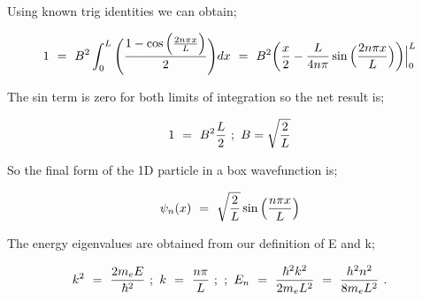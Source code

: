 \documentclass{article}
\begin{document}
Using known trig identities we can obtain;

\begin{equation} \label{eb-eq-237-1}
1 \hspace{0.125cm} = \hspace{0.125cm} B^2 \int_{0}^{L} \Bigg( \frac{1 - \cos\Big({\frac{2n\pi x}{L}\Big)}}{2} \Bigg) dx \hspace{0.125cm} = \hspace{0.125cm} B^2 \bigg( \frac{x}{2} - \frac{L}{4n\pi}\sin\Big({\frac{2n\pi x}{L}\Big)} \bigg) \Big|_0^L 
\end{equation}

The sin term is zero for both limits of integration so the net result is; 

\begin{equation} \label{eb-eq-238-1}
1 \hspace{0.125cm} = \hspace{0.125cm} B^2 \frac{L}{2} \hspace{0.125cm} ; \hspace{0.125cm} B = \sqrt{\frac{2}{L}}
\end{equation}

So the final form of the 1D particle in a box wavefunction is; 

\begin{equation} \label{eb-eq-239-1}
\psi_{n}(x) \hspace{0.125cm} = \hspace{0.125cm} \sqrt{\frac{2}{L}}\sin\Big( \frac{n\pi x}{L} \Big)
\end{equation}

The energy eigenvalues are obtained from our definition of E and k;

\begin{equation} \label{eb-eq-240-1}
k^2 \hspace{0.125cm} = \hspace{0.125cm} \frac{2m_{e}E}{\hbar^2} \hspace{0.125cm} ; \hspace{0.125cm} k \hspace{0.125cm} = \hspace{0.125cm} \frac{n\pi}{L} \hspace{0.125cm} ; \hspace{0.125cm} ; \hspace{0.125cm} E_n \hspace{0.125cm} = \hspace{0.125cm} \frac{\hbar^{2}k^{2}}{2m_{e}L^{2}} \hspace{0.125cm} = \hspace{0.125cm} \frac{h^{2}n^{2}}{8m_{e}L^{2}} \hspace{0.125cm} . 
\end{equation}
\end{document}
